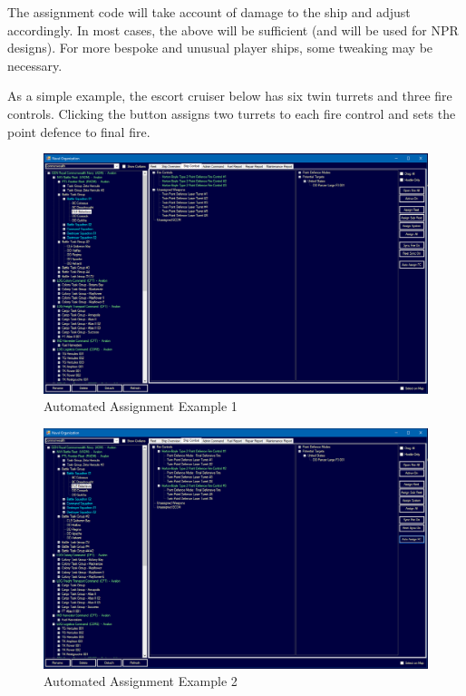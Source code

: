 \documentclass[../Aurora C# unofficial manual.tex]{subfiles}
\begin{document}
	The assignment code will take account of damage to the ship and adjust accordingly. In most cases, the above will be sufficient (and will be used for NPR designs). For more bespoke and unusual player ships, some tweaking may be necessary.
	
	As a simple example, the escort cruiser below has six twin turrets and three fire controls. Clicking the button assigns two turrets to each fire control and sets the point defence to final fire.
	\begin{figure}[H]
		\centering
		\includegraphics[width=0.95\linewidth]{images/AutomatedAssignment}
		\caption[Automated Assignment]{Automated Assignment Example 1}
		\label{fig:automatedassignment}
	\end{figure}
	\begin{figure}[H]
		\centering
		\includegraphics[width=0.95\linewidth]{images/AutomatedAssignment2}
		\caption[Automated Assignment]{Automated Assignment Example 2}
		\label{fig:automatedassignment2}
	\end{figure}
	
\end{document}
